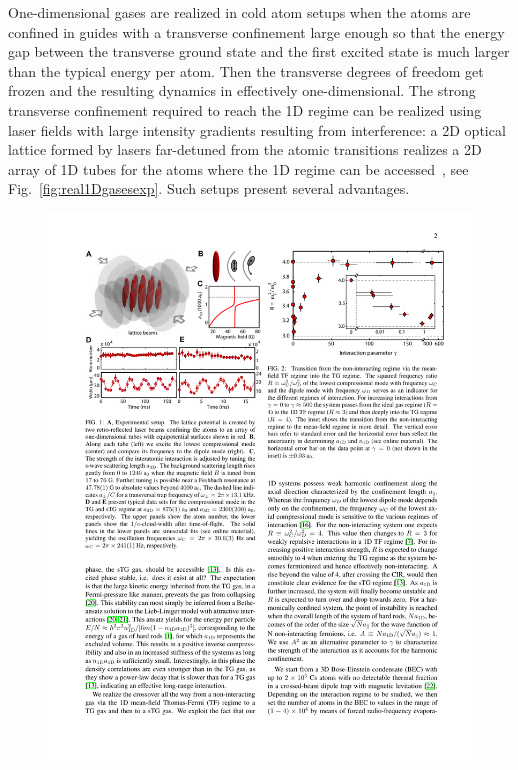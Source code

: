 \documentclass[onecolumn,amsfonts,showpacs,superscriptaddress]{revtex4-1}
\begin{document}
One-dimensional gases are realized in cold atom setups when the atoms are
confined in guides with a transverse confinement large enough so that the
energy gap between the transverse ground state and the first
excited state is much larger than the typical energy per atom. Then the
transverse degrees of freedom get  frozen and the resulting dynamics
in effectively one-dimensional.
The strong transverse confinement required to reach the 1D regime can be realized
using laser fields with large intensity gradients resulting from interference:
a 2D optical lattice
formed by lasers far-detuned from the atomic transitions realizes a 2D array
of 1D tubes for the atoms where the 1D regime can be accessed~\citep{kinoshita_local_2005,haller_realization_2009,fabbri_momentum-resolved_2011}, see Fig.~\ref{fig:real1Dgasesexp}.
Such setups present several advantages.
\begin{figure}
    \centering
    \includegraphics[viewport=47 615 215 750,clip]{figures/figure_reseau_HallerReal2009.pdf}\\

\end{figure}
\end{document}

